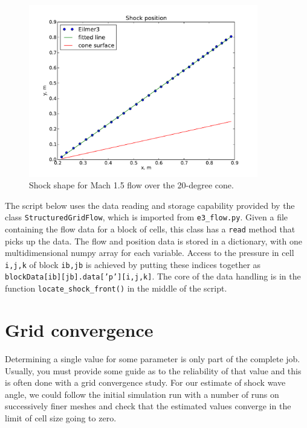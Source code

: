 \begin{figure}[htbp]
\begin{center}
\includegraphics[width=10cm]{../2D/cone20-simple/shock-shape.pdf}
\end{center}
\caption{Shock shape for Mach 1.5 flow over the 20-degree cone.}
\label{cone20-shock-points-fig}
\end{figure}

The script below uses the data reading and storage capability provided by 
the class \texttt{StructuredGridFlow}, which is imported from \texttt{e3\_flow.py}.
Given a file containing the flow data for a block of cells, this class has a \texttt{read} 
method that picks up the data.
The flow and position data is stored in a dictionary, with one multidimensional numpy array 
for each variable.
Access to the pressure in cell \texttt{i,j,k} of block \texttt{ib,jb} is achieved by
putting these indices together as \texttt{blockData[ib][jb].data['p'][i,j,k]}.
The core of the data handling is in the function \texttt{locate\_shock\_front()}
in the middle of the script.

\noindent
\topbar

\bottombar

\section{Grid convergence}
%
Determining a single value for some parameter is only part of the complete job.
Usually, you must provide some guide as to the reliability of that value and
this is often done with a grid convergence study.
For our estimate of shock wave angle, we could follow the initial simulation run with a 
number of runs on successively finer meshes and check that the estimated values converge 
in the limit of cell size going to zero.

